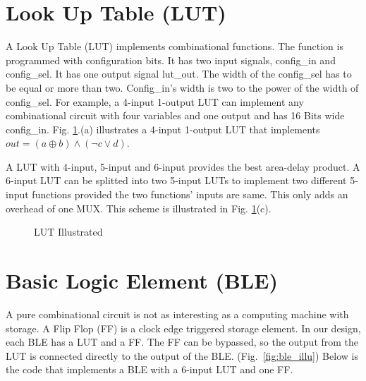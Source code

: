 \section{Look Up Table (LUT)}
\label{sec:lut}

A Look Up Table (LUT) implements combinational functions. The function
is programmed with configuration bits. It has two input signals, config\_in and config\_sel.
It has one output signal lut\_out. The width of the config\_sel has to be equal or more than two. Config\_in's 
width is two to the power of the width of config\_sel. For example, a 4-input 1-output LUT 
can implement any combinational circuit with four variables and one output and has 16 Bits
wide config\_in. Fig. \ref{fig:lut_illu}.(a) illustrates a 4-input 1-output 
LUT that implements $out=(a \oplus b) \land (\lnot c \lor d)$. \par

A LUT with 4-input, 5-input and 6-input provides the best area-delay product. \cite{1281800}
A 6-input LUT can be splitted into two 5-input LUTs to implement two different 5-input functions provided the two
functions' inputs are same. This only adds an overhead of one MUX. This scheme is illustrated in Fig. \ref{fig:lut_illu}(c). \par

\begin{figure}[htp]
	\begin{center}
		\renewcommand{\captionfont}{\small}
		
		\vspace{0.5cm}
			
		\caption{LUT Illustrated}
		\label{fig:lut_illu}
	\end{center}
\end{figure}

\section{Basic Logic Element (BLE)}
\label{sec:ble}

A pure combinational circuit is not as interesting as a computing machine with storage. A Flip Flop (FF) is a
clock edge triggered storage element. In our design, each BLE has a LUT and a FF. The FF can be bypassed, so
the output from the LUT is connected directly to the output of the BLE. (Fig.~\ref{fig:ble_illu}) Below is the code that implements
a BLE with a 6-input LUT and one FF. \par

